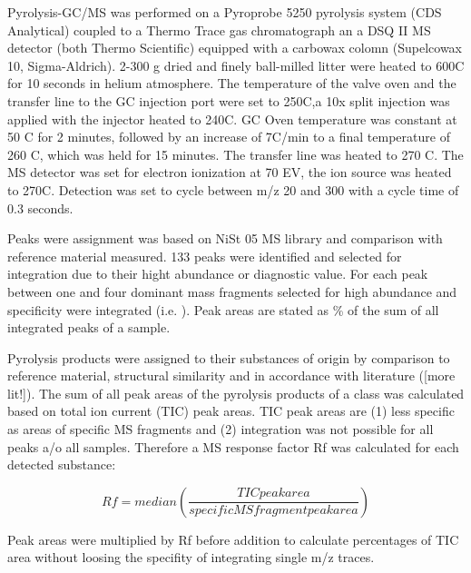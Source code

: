 \documentclass[preprint,review,12pt]{elsarticle}
\begin{document}
Pyrolysis-GC/MS was performed on a Pyroprobe 5250 pyrolysis system (CDS Analytical) coupled to a Thermo Trace gas chromatograph an a DSQ II MS detector (both Thermo Scientific) equipped with a carbowax colomn (Supelcowax 10, Sigma-Aldrich). 2-300 \textmu g dried and finely ball-milled litter were heated to 600\textdegree C for 10 seconds in helium atmosphere. The temperature of the valve oven and the transfer line to the GC injection port were set to 250\textdegree C,a 10x split injection was applied with the injector heated to 240\textdegree C. GC Oven temperature was constant at 50 \textdegree C for 2 minutes, followed by an increase of 7\textdegree C/min to a final temperature of 260 \textdegree C, which was held for 15 minutes. The transfer line was heated to 270 \textdegree C. The MS detector was set for electron ionization at 70 EV, the ion source was heated to 270\textdegree C. Detection was set to cycle between m/z 20 and 300 with a cycle time of 0.3 seconds.

Peaks were assignment was based on NiSt 05 MS library and comparison with reference material measured. 133 peaks were identified and selected for integration due to their hight abundance or diagnostic value. For each peak between one and four dominant mass fragments selected for high abundance and specificity were integrated (i.e. \cite{Schellekens2009, Kuder1998}). Peak areas are stated as \% of the sum of all integrated peaks of a sample. 

Pyrolysis products were assigned to their substances of origin by comparison to reference material, structural similarity and in accordance with literature (\cite{Ralph1991a, Schellekens2009, Chiavari1992}[more lit!]). The sum of all peak areas of the pyrolysis products of a class was calculated based on total ion current (TIC) peak areas. TIC peak areas are (1) less specific as areas of specific MS fragments and (2) integration was not possible for all peaks a/o all samples. Therefore a MS response factor Rf was calculated for each detected substance:

\begin{equation}
Rf = median (\frac{TIC peak area}{specific MS fragment peak area})
\end{equation}

Peak areas were multiplied by Rf before addition to calculate percentages of TIC area without loosing the specifity of integrating single m/z traces.

\end{document}
